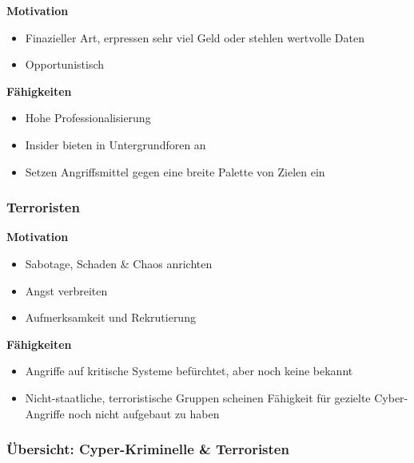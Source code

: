 \begin{minipage}{0.5\linewidth}
    \textbf{Motivation}
    \begin{itemize}
        \item Finazieller Art, erpressen sehr viel Geld oder stehlen wertvolle Daten
        \item Opportunistisch
    \end{itemize}
\end{minipage}
\begin{minipage}{0.45\linewidth}
    \textbf{Fähigkeiten}\\
    \begin{itemize}
        \item Hohe Professionalisierung
        \item Insider bieten in Untergrundforen an
        \item Setzen Angriffsmittel gegen eine breite Palette von Zielen ein
    \end{itemize}
\end{minipage}


\subsubsection{Terroristen}
\begin{minipage}{0.5\linewidth}
    \textbf{Motivation}
    \begin{itemize}
        \item Sabotage, Schaden \& Chaos anrichten
        \item Angst verbreiten
        \item Aufmerksamkeit und Rekrutierung
    \end{itemize}
\end{minipage}
\begin{minipage}{0.45\linewidth}
    \textbf{Fähigkeiten}\\
    \begin{itemize}
        \item Angriffe auf kritische Systeme befürchtet, aber noch keine bekannt
        \item Nicht-staatliche, terroristische Gruppen scheinen Fähigkeit für gezielte Cyber-Angriffe noch nicht aufgebaut zu haben\\
    \end{itemize}
\end{minipage}

\subsubsection{Übersicht: Cyper-Kriminelle \& Terroristen}

